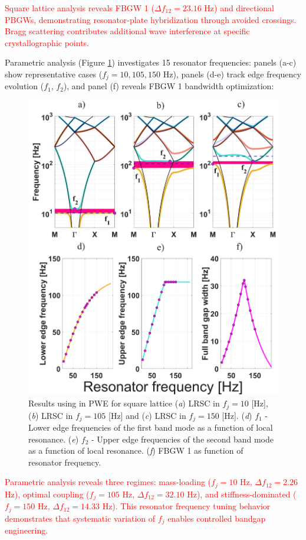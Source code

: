 \documentclass[review,numbers,sort&compress]{elsarticle}
\begin{document}
\textcolor{red}{Square lattice analysis reveals FBGW 1 ($\Delta f_{12} = 23.16$ Hz) and directional PBGWs, demonstrating resonator-plate hybridization through avoided crossings. Bragg scattering contributes additional wave interference at specific crystallographic points.}

Parametric analysis (Figure \ref{pwe_disp_square_all_res}) investigates 15 resonator frequencies: panels (a-c) show representative cases ($f_j = 10, 105, 150$ Hz), panels (d-e) track edge frequency evolution ($f_1$, $f_2$), and panel (f) reveals FBGW 1 bandwidth optimization:

\begin{figure}[htb]
	\centering
	\includegraphics[width=.8\textwidth]{2_1_disp_frf_square.pdf}
	\caption{Results using in PWE for square lattice (\textit{a}) LRSC in $f_j=10$ [Hz], (\textit{b}) LRSC in $f_j=105$ [Hz] and (\textit{c}) LRSC in $f_j=150$ [Hz]. (\textit{d}) $f_1$ - Lower edge frequencies of the first band mode as a function of local resonance. (\textit{e}) $f_2$ - Upper edge frequencies of the second band mode as a function of local resonance. (\textit{f}) FBGW 1 as function of resonator frequency.}
	\label{pwe_disp_square_all_res}
\end{figure}

\textcolor{red}{Parametric analysis reveals three regimes: mass-loading ($f_j = 10$ Hz, $\Delta f_{12} = 2.26$ Hz), optimal coupling ($f_j = 105$ Hz, $\Delta f_{12} = 32.10$ Hz), and stiffness-dominated ($f_j = 150$ Hz, $\Delta f_{12} = 14.33$ Hz). This resonator frequency tuning behavior demonstrates that systematic variation of $f_j$ enables controlled bandgap engineering.}
\end{document}
